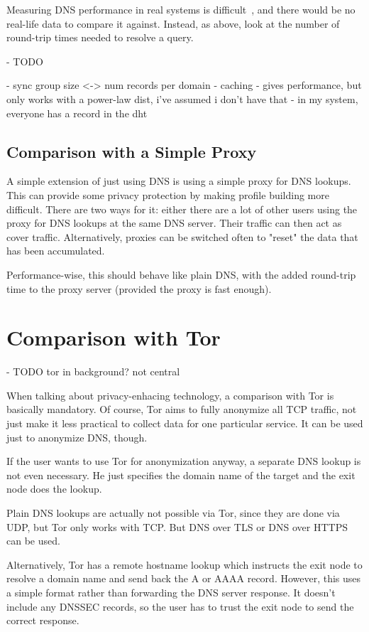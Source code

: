 Measuring DNS performance in real systems is
difficult~\cite{liston2002diversity}, and there would be no real-life data to
compare it against. Instead, as above, look at the number of round-trip times
needed to resolve a query.

- TODO

- sync group size <-> num records per domain
- caching
    - gives performance, but only works with a power-law dist, i've assumed i
      don't have that
- in my system, everyone has a record in the dht

\subsection{Comparison with a Simple Proxy}
A simple extension of just using DNS is using a simple proxy for DNS lookups.
This can provide some privacy protection by making profile building more
difficult. There are two ways for it: either there are a lot of other users
using the proxy for DNS lookups at the same DNS server. Their traffic can then
act as cover traffic. Alternatively, proxies can be switched often to "reset"
the data that has been accumulated.

Performance-wise, this should behave like plain DNS, with the added round-trip
time to the proxy server (provided the proxy is fast enough).

\section{Comparison with Tor}
- TODO tor in background? not central

When talking about privacy-enhacing technology, a comparison with Tor is
basically mandatory. Of course, Tor aims to fully anonymize all TCP traffic, not
just make it less practical to collect data for one particular service. It can
be used just to anonymize DNS, though.

If the user wants to use Tor for anonymization anyway, a separate DNS lookup is
not even necessary. He just specifies the domain name of the target and the exit
node does the lookup.

Plain DNS lookups are actually not possible via Tor, since they are done via
UDP, but Tor only works with TCP. But DNS over TLS or DNS over HTTPS can be
used.

Alternatively, Tor has a remote hostname lookup which instructs the exit node to
resolve a domain name and send back the A or AAAA record. However, this uses a
simple format rather than forwarding the DNS server response. It doesn't include
any DNSSEC records, so the user has to trust the exit node to send the correct
response.

